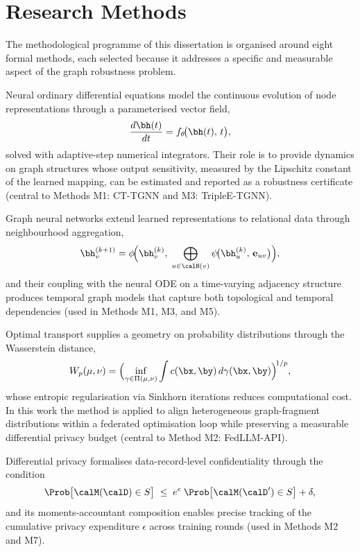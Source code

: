 \section*{Research Methods}

The methodological programme of this dissertation is organised around eight formal methods, each selected because it addresses a specific and measurable aspect of the graph robustness problem.

Neural ordinary differential equations model the continuous evolution of node representations through a parameterised vector field,
\begin{equation}
\frac{d\bh(t)}{dt} = f_\theta\!\bigl(\bh(t),\, t\bigr),
\label{eq:node}
\end{equation}
solved with adaptive-step numerical integrators. Their role is to provide dynamics on graph structures whose output sensitivity, measured by the Lipschitz constant of the learned mapping, can be estimated and reported as a robustness certificate (central to Methods M1: CT-TGNN and M3: TripleE-TGNN).

Graph neural networks extend learned representations to relational data through neighbourhood aggregation,
\begin{equation}
\bh_v^{(k+1)}
= \phi\!\Bigl(\bh_v^{(k)},\;
  \bigoplus_{u\in\calN(v)}
    \psi\!\bigl(\bh_u^{(k)},\, \mathbf{e}_{uv}\bigr)\Bigr),
\label{eq:gnn_mp}
\end{equation}
and their coupling with the neural ODE on a time-varying adjacency structure produces temporal graph models that capture both topological and temporal dependencies (used in Methods M1, M3, and M5).

Optimal transport supplies a geometry on probability distributions through the Wasserstein distance,
\begin{equation}
W_p(\mu,\nu)
= \Bigl(\inf_{\gamma\in\Pi(\mu,\nu)}
    \int c(\bx,\by)\,d\gamma(\bx,\by)
  \Bigr)^{\!1/p},
\label{eq:wasserstein}
\end{equation}
whose entropic regularisation via Sinkhorn iterations reduces computational cost. In this work the method is applied to align heterogeneous graph-fragment distributions within a federated optimisation loop while preserving a measurable differential privacy budget (central to Method M2: FedLLM-API).

Differential privacy formalises data-record-level confidentiality through the condition
\begin{equation}
\Prob\bigl[\calM(\calD)\in S\bigr]
\;\le\;
e^{\epsilon}\;\Prob\bigl[\calM(\calD')\in S\bigr] + \delta,
\label{eq:dp}
\end{equation}
and its moments-accountant composition enables precise tracking of the cumulative privacy expenditure $\epsilon$ across training rounds (used in Methods M2 and M7).

